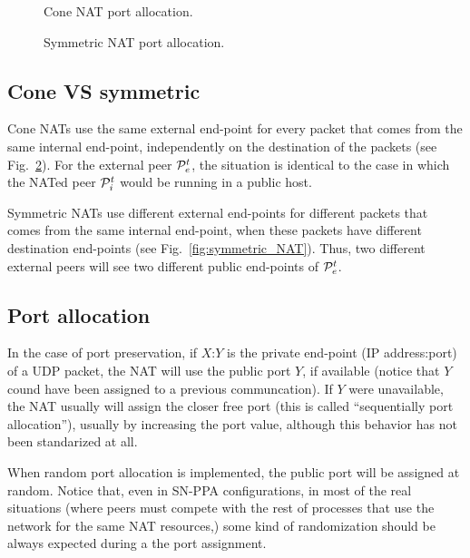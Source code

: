 \begin{figure}
  \caption{Cone NAT port allocation.\label{fig:cone_NAT}}
\end{figure}

\begin{figure}
  \caption{Symmetric NAT port allocation.\label{fig:cone_NAT}}
\end{figure}

\subsection{Cone VS symmetric}
Cone NATs use the same external end-point for every packet that comes
from the same internal end-point, independently on the destination of
the packets (see Fig.~\ref{fig:cone_NAT}). For the external peer ${\cal
  P}^t_e$, the situation is identical to the case in which the NATed
peer ${\cal P}^t_i$ would be running in a public host.

Symmetric NATs use different external end-points for different packets
that comes from the same internal end-point, when these packets have
different destination end-points (see Fig.~\ref{fig:symmetric_NAT}). Thus,
two different external peers will see two different public end-points
of ${\cal P}^t_e$.

\subsection{Port allocation}
In the case of port preservation, if $X$:$Y$ is the private end-point
(IP address:port) of a UDP packet, the NAT will use the public port
$Y$, if available (notice that $Y$ cound have been assigned to a
previous communcation). If $Y$ were unavailable, the NAT usually will
assign the closer free port (this is called ``sequentially port
allocation''), usually by increasing the port value, although this
behavior has not been standarized at all.

When random port allocation is implemented, the public port will be
assigned at random. Notice that, even in SN-PPA configurations, in
most of the real situations (where peers must compete with the rest of
processes that use the network for the same NAT resources,) some kind
of randomization should be always expected during a the port
assignment.


